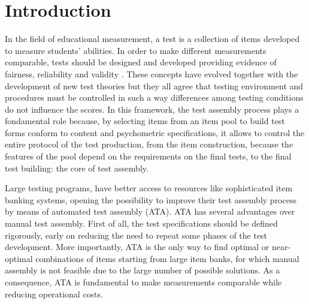 
\chapter{Introduction} %

\label{Introduction2} %


\newcommand{\keyword}[1]{\textbf{#1}}
\newcommand{\tabhead}[1]{\textbf{#1}}
\newcommand{\code}[1]{\texttt{#1}}
\newcommand{\file}[1]{\texttt{\bfseries#1}}
\newcommand{\option}[1]{\texttt{\itshape#1}}

In the field of educational measurement, a test is a collection of items developed to measure students' abilities. In order to make different measurements comparable, tests should be designed and developed providing evidence of fairness, reliability and validity \parencite{AERA2014}. These concepts have evolved together with the development of new test theories but they all agree that testing environment and procedures must be controlled in such a way differences among testing conditions do not influence the scores. In this framework, the test assembly process plays a fondamental role because, by selecting items from an item pool to build test forms conform to content and psychometric specifications, it allows to control the entire protocol of the test production, from the item construction, because the features of the pool depend on the requirements on the final tests, to the final test building: the core of test assembly. 

Large testing programs, have better access to resources like sophisticated item banking systems, opening the possibility to improve their test assembly process by means of automated test assembly (ATA). ATA has several advantages over manual test assembly. First of all, the test specifications should be defined rigorously, early on reducing the need to repeat some phases of the test development. More importantly, ATA is the only way to find optimal or near-optimal combinations of items starting from large item banks, for which manual assembly is not feasible due to the large number of possible solutions. As a consequence, ATA is fundamental to make measurements comparable while reducing operational costs. 

